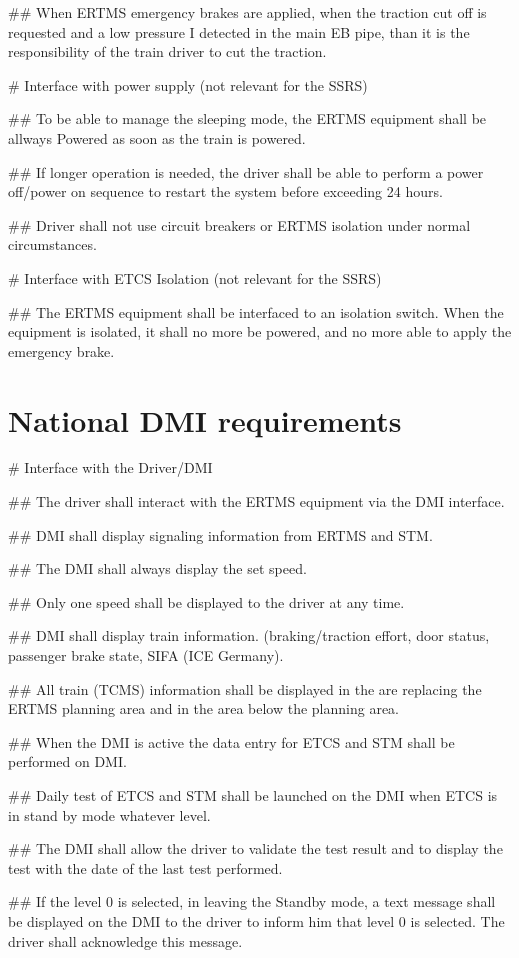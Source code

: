 \documentclass{template/openetcs_article}
\begin{document}
\begin{easylist}
## When ERTMS emergency brakes are applied, when the traction cut off is requested and a low pressure I detected in the main EB pipe, than it is the responsibility of the train driver to cut the traction.

# Interface with power supply (not relevant for the SSRS)

## To be able to manage the sleeping mode, the ERTMS equipment shall be allways Powered as soon as the train is powered.

## If longer operation is needed, the driver shall be able to perform a power off/power on sequence to restart the system before exceeding 24 hours.

## Driver shall not use circuit breakers or ERTMS isolation under normal circumstances.

# Interface with ETCS Isolation (not relevant for the SSRS)

## The ERTMS equipment shall be interfaced to an isolation switch. When the equipment is isolated, it shall no more be powered, and no more able to apply the emergency brake.

\end{easylist}



\section{National DMI requirements}
\begin{easylist}
# Interface with the Driver/DMI

## The driver shall interact with the ERTMS equipment via the DMI interface.

## DMI shall display signaling information from ERTMS and STM.

## The DMI shall always display the set speed.

## Only one speed shall be displayed to the driver at any time.

## DMI shall display train information. (braking/traction effort, door status, passenger brake state, SIFA (ICE Germany).

## All train (TCMS) information shall be displayed in the are replacing the ERTMS planning area and in the area below the planning area.

## When the DMI is active the data entry for ETCS and STM shall be performed on DMI.

## Daily test of ETCS and STM shall be launched on the DMI when ETCS is in stand by mode whatever level.

## The DMI shall allow the driver to validate the test result and to display the test with the date of the last test performed.

## If the level 0 is selected, in leaving the Standby mode, a text message shall be displayed on the DMI to the driver to inform him that level 0 is selected. The driver shall acknowledge this message.
\end{easylist}
\end{document}

